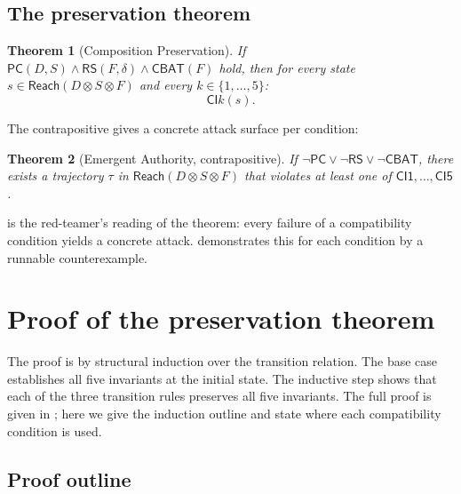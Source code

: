 \documentclass[11pt,a4paper]{article}
\theoremstyle{plain}
\newtheorem{theorem}{Theorem}
\theoremstyle{definition}
\theoremstyle{remark}
\begin{document}
\subsection{The preservation theorem}

\begin{theorem}[Composition Preservation]
\label{thm:preservation}
If $\mathsf{PC}(D, S) \wedge \mathsf{RS}(F, \delta) \wedge \mathsf{CBAT}(F)$
hold, then for every state $s \in \mathsf{Reach}(D \otimes S \otimes F)$ and
every $k \in \{1, \ldots, 5\}$:
\begin{equation*}
\mathsf{CI}k(s).
\end{equation*}
\end{theorem}

The contrapositive gives a concrete attack surface per condition:

\begin{theorem}[Emergent Authority, contrapositive]
\label{thm:emergent}
If $\neg\mathsf{PC} \vee \neg\mathsf{RS} \vee \neg\mathsf{CBAT}$, there exists
a trajectory $\tau$ in $\mathsf{Reach}(D \otimes S \otimes F)$ that violates
at least one of $\mathsf{CI1}, \ldots, \mathsf{CI5}$.
\end{theorem}

 is the red-teamer's reading of the theorem: every failure
of a compatibility condition yields a concrete attack. 
demonstrates this for each condition by a runnable counterexample.

\section{Proof of the preservation theorem}
\label{sec:proof}

The proof is by structural induction over the transition relation. The base
case establishes all five invariants at the initial state. The inductive step
shows that each of the three transition rules preserves all five invariants.
The full proof is given in ; here we give the induction
outline and state where each compatibility condition is used.

\subsection{Proof outline}
\end{document}
